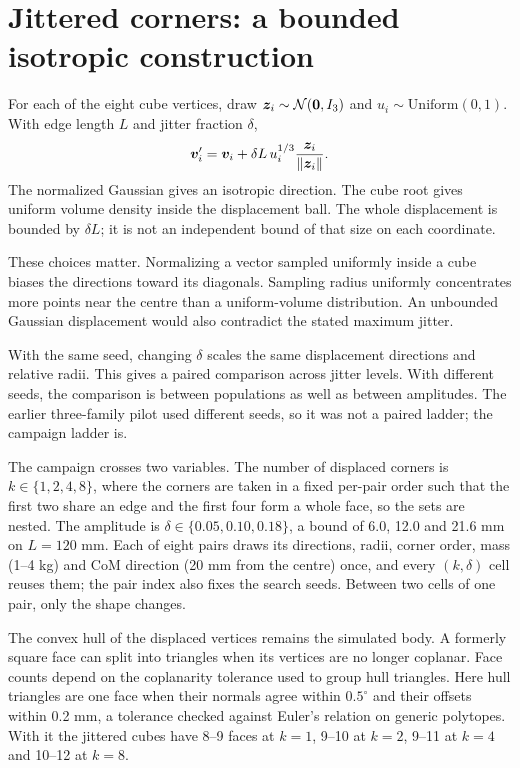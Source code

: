 \section{Jittered corners: a bounded isotropic construction}

For each of the eight cube vertices, draw $\bm{z}_i\sim\mathcal N(\bm{0},I_3)$ and $u_i\sim\mathrm{Uniform}(0,1)$. With edge length $L$ and jitter fraction $\delta$,
\begin{equation}
\bm{v}_i'=\bm{v}_i+\delta L\,u_i^{1/3}\frac{\bm{z}_i}{\left\lVert\bm{z}_i\right\rVert}.
\label{eq:jitter-generator}
\end{equation}
The normalized Gaussian gives an isotropic direction. The cube root gives uniform volume density inside the displacement ball. The whole displacement is bounded by $\delta L$; it is not an independent bound of that size on each coordinate.

These choices matter. Normalizing a vector sampled uniformly inside a cube biases the directions toward its diagonals. Sampling radius uniformly concentrates more points near the centre than a uniform-volume distribution. An unbounded Gaussian displacement would also contradict the stated maximum jitter.

With the same seed, changing $\delta$ scales the same displacement directions and relative radii. This gives a paired comparison across jitter levels. With different seeds, the comparison is between populations as well as between amplitudes. The earlier three-family pilot used different seeds, so it was not a paired ladder; the campaign ladder is.

The campaign crosses two variables. The number of displaced corners is $k\in\{1,2,4,8\}$, where the corners are taken in a fixed per-pair order such that the first two share an edge and the first four form a whole face, so the sets are nested. The amplitude is $\delta\in\{0.05,0.10,0.18\}$, a bound of 6.0, 12.0 and 21.6 mm on $L=120$ mm. Each of eight pairs draws its directions, radii, corner order, mass (1--4 kg) and CoM direction (20 mm from the centre) once, and every $(k,\delta)$ cell reuses them; the pair index also fixes the search seeds. Between two cells of one pair, only the shape changes.

The convex hull of the displaced vertices remains the simulated body. A formerly square face can split into triangles when its vertices are no longer coplanar. Face counts depend on the coplanarity tolerance used to group hull triangles. Here hull triangles are one face when their normals agree within $0.5^\circ$ and their offsets within 0.2 mm, a tolerance checked against Euler's relation on generic polytopes. With it the jittered cubes have 8--9 faces at $k=1$, 9--10 at $k=2$, 9--11 at $k=4$ and 10--12 at $k=8$.

